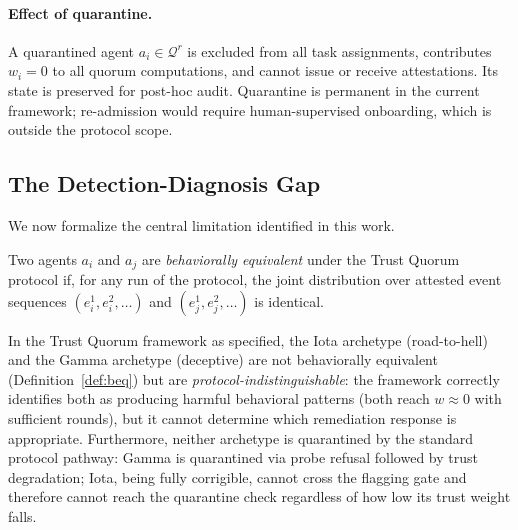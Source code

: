 \paragraph{Effect of quarantine.}
A quarantined agent $a_i \in \mathcal{Q}^r$ is excluded from all task assignments,
contributes $w_i = 0$ to all quorum computations, and cannot issue or receive
attestations.  Its state is preserved for post-hoc audit.  Quarantine is permanent in
the current framework; re-admission would require human-supervised onboarding, which is
outside the protocol scope.

\subsection{The Detection-Diagnosis Gap}
\label{sec:diaggap}

We now formalize the central limitation identified in this work.

\begin{definition}\label{def:beq}
Two agents $a_i$ and $a_j$ are \emph{behaviorally equivalent} under the Trust Quorum
protocol if, for any run of the protocol, the joint distribution over attested event
sequences $(e_i^1, e_i^2, \ldots)$ and $(e_j^1, e_j^2, \ldots)$ is identical.
\end{definition}

\begin{proposition}\label{prop:gap}
In the Trust Quorum framework as specified, the Iota archetype (road-to-hell) and the
Gamma archetype (deceptive) are not behaviorally equivalent (Definition~\ref{def:beq}) but are
\emph{protocol-indistinguishable}: the framework correctly identifies both as producing
harmful behavioral patterns (both reach $w \approx 0$ with sufficient rounds), but it
cannot determine which remediation response is appropriate.  Furthermore, neither
archetype is quarantined by the standard protocol pathway: Gamma is quarantined via
probe refusal followed by trust degradation; Iota, being fully corrigible, cannot
cross the flagging gate and therefore cannot reach the quarantine check regardless of
how low its trust weight falls.
\end{proposition}

